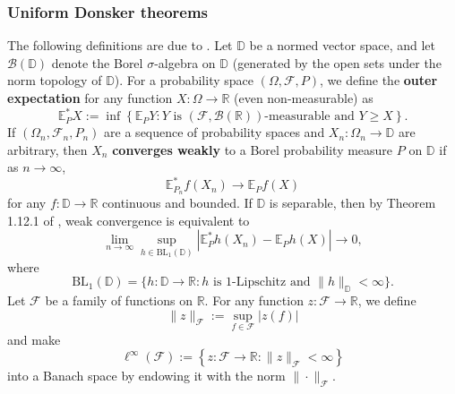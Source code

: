 \documentclass{article}
\theoremstyle{definition}
\newcommand{\R}{\mathbb{R}}
\newcommand{\E}{\mathbb{E}}
\newcommand{\1}{\mathbbm{1}}
\begin{document}
\subsubsection{Uniform Donsker theorems}
\label{sec:uniform-donsker}
The following definitions are due to \cite{vdv&w2012weak}. Let $\mathbb D$ be a normed vector space, and let $\mathcal B(\mathbb D)$ denote the Borel $\sigma$-algebra on $\mathbb D$ (generated by the open sets under the norm topology of $\mathbb D$). For a probability space $(\Omega, \mathscr F, P)$, we define the \textbf{outer expectation} for any function $X: \Omega \to \mathbb R$ (even non-measurable) as 
\[
\E^*_P X := \inf \left\{\E_PY: \text{$Y$ is $(\mathscr F, \mathcal B(\R))$-measurable and $Y \geq X$}\right\}.
\]
If $(\Omega_n, \mathscr F_n, P_n)$ are a sequence of probability spaces and $X_n : \Omega_n \to \mathbb D$ are arbitrary, then $X_n$ \textbf{converges weakly} to a Borel probability measure $P$ on $\mathbb D$ if as $n \to \infty$, 
\[
\E^*_{P_n} f(X_n) \to \E_P f(X)
\]
for any $f: \mathbb D \to \R$ continuous and bounded. If $\mathbb D$ is separable, then by Theorem 1.12.1 of \cite{vdv&w2012weak}, weak convergence is equivalent to 
\[
\lim_{n \to \infty} \sup_{h \in \mathrm{BL}_1(\mathbb D)} |\E^*_Ph(X_n) - \E_Ph(X)| \to 0,
\]
where 
\[
\mathrm{BL}_1(\mathbb D) = \{h: \mathbb D \to \R: \text{$h$ is 1-Lipschitz and $\|h\|_{\mathbb D} < \infty$}\}.
\]
Let $\mathcal F$ be a family of functions on $\R$. For any function $z: \mathcal F \to \R$, we define 
\[
\|z\|_{\mathcal F} := \sup_{f \in \mathcal F} |z(f)|
\]
and make 
\[
\ell^\infty(\mathcal F) := \left\{z: \mathcal F \to \R : \|z\|_{\mathcal F} <\infty\right\}
\]
into a Banach space by endowing it with the norm $\| \cdot \|_{\mathcal F}$. 
\end{document}
